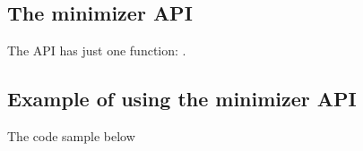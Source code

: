 


\subsection{The minimizer API}

The  API has just one function:
.

\subsection{Example of using the minimizer API}

The code sample below 


